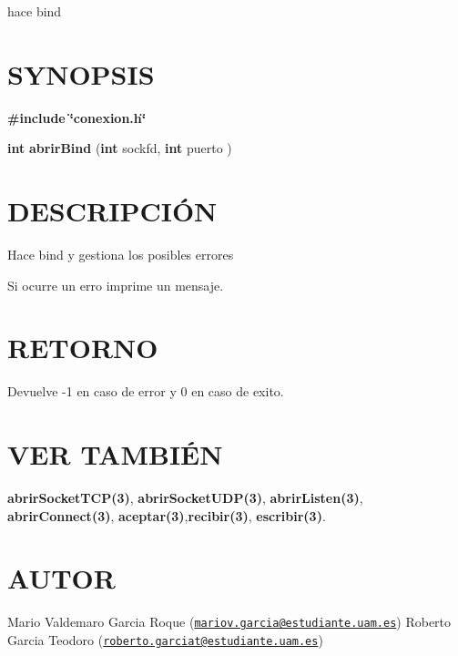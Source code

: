 hace bind\hypertarget{getTamanoFichero_SYNOPSIS}{}\section{S\-Y\-N\-O\-P\-S\-I\-S}\label{getTamanoFichero_SYNOPSIS}
{\bfseries \#include} {\bfseries \char`\"{}conexion.\-h\char`\"{}} 

{\bfseries int} {\bfseries abrir\-Bind} {\bfseries }({\bfseries int} sockfd, {\bfseries int} puerto )\hypertarget{getTamanoFichero_descripcion}{}\section{D\-E\-S\-C\-R\-I\-P\-C\-IÓ\-N}\label{getTamanoFichero_descripcion}
Hace bind y gestiona los posibles errores

Si ocurre un erro imprime un mensaje.\hypertarget{getTamanoFichero_retorno}{}\section{R\-E\-T\-O\-R\-N\-O}\label{getTamanoFichero_retorno}
Devuelve -\/1 en caso de error y 0 en caso de exito.\hypertarget{servidorArchivo_seealso}{}\section{V\-E\-R T\-A\-M\-B\-IÉ\-N}\label{servidorArchivo_seealso}
{\bfseries abrir\-Socket\-T\-C\-P(3)}, {\bfseries abrir\-Socket\-U\-D\-P(3)}, {\bfseries abrir\-Listen(3)}, {\bfseries abrir\-Connect(3)}, {\bfseries aceptar(3)},{\bfseries recibir(3)}, {\bfseries escribir(3)}.\hypertarget{getTamanoFichero_authors}{}\section{A\-U\-T\-O\-R}\label{getTamanoFichero_authors}
Mario Valdemaro Garcia Roque (\href{mailto:mariov.garcia@estudiante.uam.es}{\tt mariov.\-garcia@estudiante.\-uam.\-es}) Roberto Garcia Teodoro (\href{mailto:roberto.garciat@estudiante.uam.es}{\tt roberto.\-garciat@estudiante.\-uam.\-es}) 